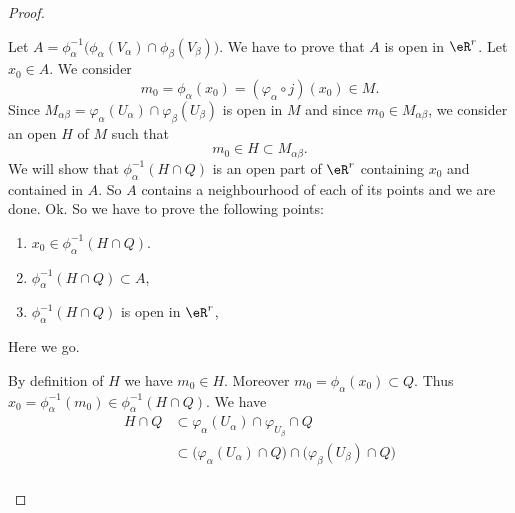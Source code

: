 \begin{proof}
\begin{subproof}
		Let \( A=\phi_{\alpha}^{-1}\big( \phi_{\alpha}(V_{\alpha})\cap \phi_{\beta}(V_{\beta}) \big)\). We have to prove that \( A\) is open in \( \eR^r\). Let \( x_0\in A\). We consider
		\begin{equation}
			m_0=\phi_{\alpha}(x_0)=(\varphi_{\alpha}\circ j)(x_0)\in M.
		\end{equation}
		Since \( M_{\alpha\beta}=\varphi_{\alpha}(U_{\alpha})\cap \varphi_{\beta}(U_{\beta})\) is open in \( M\) and since \( m_0\in M_{\alpha\beta}\), we consider an open \( H\) of \( M\) such that
		\begin{equation}
			m_0\in H\subset M_{\alpha\beta}.
		\end{equation}
		We will show that \( \phi_{\alpha}^{-1}(H\cap Q)\) is an open part of \( \eR^r\) containing \( x_0\) and contained in \( A\). So \( A\) contains a neighbourhood of each of its points and we are done. Ok. So we have to prove the following points:
		\begin{enumerate}
			\item		\label{ITEMooKUCIooNVTOnu}
			      \( x_0\in\phi_{\alpha}^{-1}(H\cap Q)\).
			\item		\label{ITEMooPCQMooVBoAZp}
			      \( \phi_{\alpha}^{-1}(H\cap Q)\subset A\),
			\item  \label{ITEMooYQNPooKqwkrU}
			      \( \phi_{\alpha}^{-1}(H\cap Q)\) is open in \( \eR^r\),
		\end{enumerate}
		Here we go.
		\begin{subproof}
			By definition of \( H\) we have \( m_0\in H\). Moreover \( m_0=\phi_{\alpha}(x_0)\subset Q\). Thus \( x_0=\phi_{\alpha}^{-1}(m_0)\in \phi_{\alpha}^{-1}(H\cap Q)\).
			We have
			\begin{subequations}
				\begin{align}
					H\cap Q & \subset\varphi_{\alpha}(U_{\alpha})\cap\varphi_{U_{\beta}}\cap Q                                                                             \\
					        & \subset \big( \varphi_{\alpha}(U_{\alpha})\cap Q \big)\cap\big( \varphi_{\beta}(U_{\beta})\cap Q \big)                                       \\

\end{align}
\end{subequations}
\end{subproof}
\end{subproof}
\end{proof}
